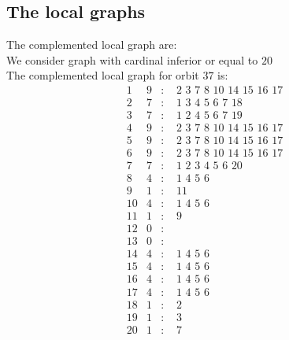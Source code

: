 \documentclass[12pt]{article}
\begin{document}
\subsection{The local graphs}
The complemented local graph are:\\
We consider graph with cardinal inferior or equal to $20$\\
The complemented local graph for orbit $37$ is:
\begin{equation*}
\begin{array}{rrcl}
1&9&:&\,\,2\,\,3\,\,7\,\,8\,\,10\,\,14\,\,15\,\,16\,\,17\\
2&7&:&\,\,1\,\,3\,\,4\,\,5\,\,6\,\,7\,\,18\\
3&7&:&\,\,1\,\,2\,\,4\,\,5\,\,6\,\,7\,\,19\\
4&9&:&\,\,2\,\,3\,\,7\,\,8\,\,10\,\,14\,\,15\,\,16\,\,17\\
5&9&:&\,\,2\,\,3\,\,7\,\,8\,\,10\,\,14\,\,15\,\,16\,\,17\\
6&9&:&\,\,2\,\,3\,\,7\,\,8\,\,10\,\,14\,\,15\,\,16\,\,17\\
7&7&:&\,\,1\,\,2\,\,3\,\,4\,\,5\,\,6\,\,20\\
8&4&:&\,\,1\,\,4\,\,5\,\,6\\
9&1&:&\,\,11\\
10&4&:&\,\,1\,\,4\,\,5\,\,6\\
11&1&:&\,\,9\\
12&0&:&\\
13&0&:&\\
14&4&:&\,\,1\,\,4\,\,5\,\,6\\
15&4&:&\,\,1\,\,4\,\,5\,\,6\\
16&4&:&\,\,1\,\,4\,\,5\,\,6\\
17&4&:&\,\,1\,\,4\,\,5\,\,6\\
18&1&:&\,\,2\\
19&1&:&\,\,3\\
20&1&:&\,\,7\\
\end{array}
\end{equation*}
\end{document}
